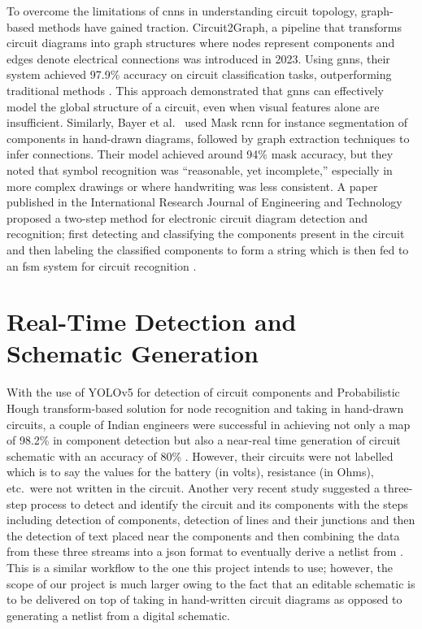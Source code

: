 To overcome the limitations of \glspl{cnn} in understanding circuit topology, graph-based methods have gained traction. Circuit2Graph, a pipeline that transforms circuit diagrams into graph structures where nodes represent components and edges denote electrical connections was introduced in 2023. Using \glspl{gnn}, their system achieved 97.9\% accuracy on circuit classification tasks, outperforming traditional methods \cite{yamakaji2023circuit2graph}. This approach demonstrated that \glspl{gnn} can effectively model the global structure of a circuit, even when visual features alone are insufficient. Similarly, Bayer et al.\ \cite{bayer2023instance} used Mask \gls{rcnn} for instance segmentation of components in hand-drawn diagrams, followed by graph extraction techniques to infer connections. Their model achieved around 94\% mask accuracy, but they noted that symbol recognition was ``reasonable, yet incomplete,'' especially in more complex drawings or where handwriting was less consistent. A paper published in the International Research Journal of Engineering and Technology proposed a two-step method for electronic circuit diagram detection and recognition; first detecting and classifying the components present in the circuit and then labeling the classified components to form a string which is then fed to an \gls{fsm} system for circuit recognition \cite{abhinav2020electric}.

\section{Real-Time Detection and Schematic Generation}

With the use of YOLOv5 for detection of circuit components and Probabilistic Hough transform-based solution for node recognition and taking in hand-drawn circuits, a couple of Indian engineers were successful in achieving not only a \gls{map} of 98.2\% in component detection but also a near-real time generation of circuit schematic with an accuracy of 80\% \cite{reddy2021handdrawn}. However, their circuits were not labelled which is to say the values for the battery (in volts), resistance (in Ohms), etc.\ were not written in the circuit. Another very recent study suggested a three-step process to detect and identify the circuit and its components with the steps including detection of components, detection of lines and their junctions and then the detection of text placed near the components and then combining the data from these three streams into a \gls{json} format to eventually derive a netlist from \cite{hemker2024schematics}. This is a similar workflow to the one this project intends to use; however, the scope of our project is much larger owing to the fact that an editable schematic is to be delivered on top of taking in hand-written circuit diagrams as opposed to generating a netlist from a digital schematic.

